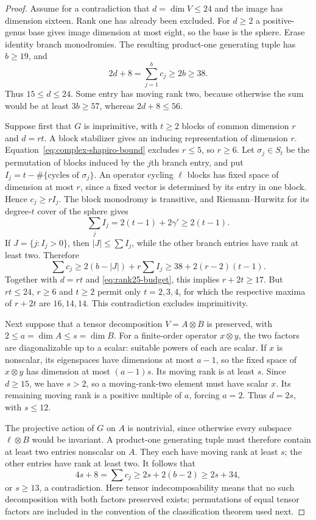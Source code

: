 \documentclass[11pt]{article}
\theoremstyle{definition}
\theoremstyle{remark}
\begin{document}
\begin{proof}
Assume for a contradiction that $d=\dim V\le24$ and the image has dimension sixteen. Rank one has already been excluded. For $d\ge2$ a positive-genus base gives image dimension at most eight, so the base is the sphere. Erase identity branch monodromies. The resulting product-one generating tuple has $b\ge19$, and
\begin{equation}\label{eq:rank25-budget}
 2d+8=\sum_{j=1}^{b}c_j\ge2b\ge38.
\end{equation}
Thus $15\le d\le24$. Some entry has moving rank two, because otherwise the sum would be at least $3b\ge57$, whereas $2d+8\le56$.

Suppose first that $G$ is imprimitive, with $t\ge2$ blocks of common dimension $r$ and $d=rt$. A block stabilizer gives an inducing representation of dimension $r$. Equation~\eqref{eq:complex-shapiro-bound} excludes $r\le5$, so $r\ge6$. Let $\sigma_j\in S_t$ be the permutation of blocks induced by the $j$th branch entry, and put $I_j=t-\#\{\text{cycles of }\sigma_j\}$. An operator cycling $\ell$ blocks has fixed space of dimension at most $r$, since a fixed vector is determined by its entry in one block. Hence $c_j\ge rI_j$. The block monodromy is transitive, and Riemann--Hurwitz for its degree-$t$ cover of the sphere gives
\[
 \sum_j I_j=2(t-1)+2\gamma'\ge2(t-1).
\]
If $J=\{j:I_j>0\}$, then $|J|\le\sum I_j$, while the other branch entries have rank at least two. Therefore
\[
 \sum c_j\ge2(b-|J|)+r\sum I_j
       \ge38+2(r-2)(t-1).
\]
Together with $d=rt$ and \eqref{eq:rank25-budget}, this implies $r+2t\ge17$. But $rt\le24$, $r\ge6$ and $t\ge2$ permit only $t=2,3,4$, for which the respective maxima of $r+2t$ are $16,14,14$. This contradiction excludes imprimitivity.

Next suppose that a tensor decomposition $V=A\otimes B$ is preserved, with $2\le a=\dim A\le s=\dim B$. For a finite-order operator $x\otimes y$, the two factors are diagonalizable up to a scalar: suitable powers of each are scalar. If $x$ is nonscalar, its eigenspaces have dimensions at most $a-1$, so the fixed space of $x\otimes y$ has dimension at most $(a-1)s$. Its moving rank is at least $s$. Since $d\ge15$, we have $s>2$, so a moving-rank-two element must have scalar $x$. Its remaining moving rank is a positive multiple of $a$, forcing $a=2$. Thus $d=2s$, with $s\le12$.

The projective action of $G$ on $A$ is nontrivial, since otherwise every subspace $\ell\otimes B$ would be invariant. A product-one generating tuple must therefore contain at least two entries nonscalar on $A$. They each have moving rank at least $s$; the other entries have rank at least two. It follows that
\[
 4s+8=\sum c_j\ge2s+2(b-2)\ge2s+34,
\]
or $s\ge13$, a contradiction. Here tensor indecomposability means that no such decomposition with both factors preserved exists; permutations of equal tensor factors are included in the convention of the classification theorem used next.


\end{proof}
\end{document}
